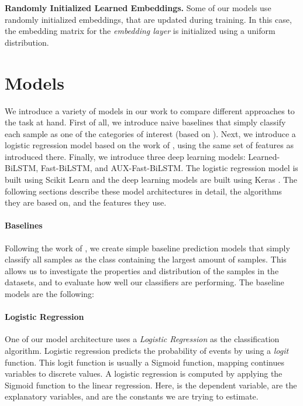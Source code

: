 \documentclass{article}
\begin{document}
\textbf{Randomly Initialized Learned Embeddings.} Some of our models use randomly initialized embeddings, that are updated during training. In this case, the embedding matrix for the \textit{embedding layer} is initialized using a uniform distribution.

\section{Models}\label{sec:models}
We introduce a variety of models in our work to compare different approaches to the task at hand. First of all, we introduce naive baselines that simply classify each sample as one of the categories of interest (based on \cite{zampieri2019predicting}). Next, we introduce a logistic regression model based on the work of \cite{davidson2017automated}, using the same set of features as introduced there. Finally, we introduce three deep learning models: Learned-BiLSTM, Fast-BiLSTM, and AUX-Fast-BiLSTM. The logistic regression model is built using Scikit Learn \cite{pedregosa2011scikit} and the deep learning models are built using Keras \cite{chollet2015keras}. The following sections describe these model architectures in detail, the algorithms they are based on, and the features they use.


\paragraph{Baselines}\label{ssec:baselines}
Following the work of \cite{zampieri2019predicting}, we create simple baseline prediction models that simply classify all samples as the class containing the largest amount of samples. This allows us to investigate the properties and distribution of the samples in the datasets, and to evaluate how well our classifiers are performing. The baseline models are the following:

\paragraph{Logistic Regression}
One of our model architecture uses a \textit{Logistic Regression} as the classification algorithm. Logistic regression predicts the probability of events by using a \textit{logit} function. This logit function is usually a Sigmoid function, mapping continues variables to discrete values. A logistic regression  is computed by applying the Sigmoid function to the linear regression. Here,  is the dependent variable,  are the explanatory variables, and  are the constants we are trying to estimate.
\end{document}
